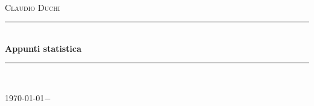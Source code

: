 \documentclass[a4paper,oneside]{book}%
\newcommand{\HRule}{\rule{\linewidth}{0.5mm}}
\begin{document}
\frontmatter
\begin{titlepage}
	
	\begin{center}
		
		
		\\[1cm]    
		
		\textsc{\LARGE Claudio Duchi}\\[1.5cm]
		
		
		
		\HRule \\[0.4cm]
		{ \huge \bfseries Appunti statistica}\\[0.4cm]
		
		\HRule \\[1.5cm]
		
		
		\vfill
		
		{\large \today $-$\currenttime}
		
	\end{center}
	
\end{titlepage}
	

	\listoffigures
	\listoftables

	\tableofcontents
	\mainmatter
%
	
	
	

%	
%    
%	 
 

\nocite{*}
\printbibliography
{}
	\printindex
\end{document}
